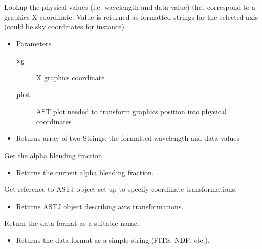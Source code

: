 \begin{desc}Lookup the physical values (i.e. wavelength and data value)
 that correspond to a graphics X coordinate. Value is returned
 as formatted strings for the selected axis (could be sky
 coordinates for instance).
\begin{itemize}
\item{Parameters
  \begin{description}
   \item[\textbf{xg}]{X graphics coordinate}
   \item[\textbf{plot}]{AST plot needed to transform graphics position
             into physical coordinates}
  \end{description}}
\end{itemize}
\begin{itemize}
\item{Returns array of two Strings, the formatted wavelength and
         data values }
\end{itemize}
\end{desc}

\begin{desc}Get the alpha blending fraction.
\begin{itemize}
\item{Returns the current alpha blending fraction. }
\end{itemize}
\end{desc}

\begin{desc}Get reference to ASTJ object set up to specify coordinate
 transformations.
\begin{itemize}
\item{Returns ASTJ object describing axis transformations. }
\end{itemize}
\end{desc}

\begin{desc}Return the data format as a suitable name.
\begin{itemize}
\item{Returns the data format as a simple string (FITS, NDF, etc.). }
\end{itemize}
\end{desc}

